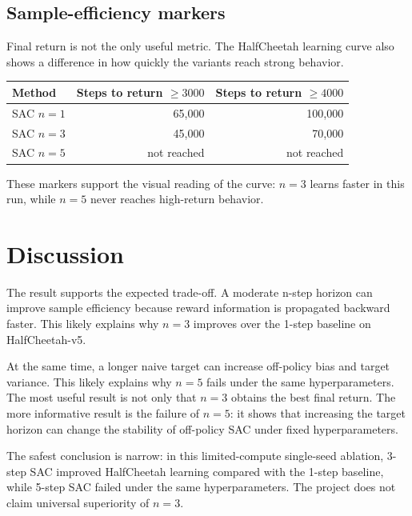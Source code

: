 \documentclass[
  american,
]{article}
\begin{document}
\subsection{Sample-efficiency markers}\label{sample-efficiency-markers}

Final return is not the only useful metric. The HalfCheetah learning
curve also shows a difference in how quickly the variants reach strong
behavior.

\begin{longtable}[]{@{}lrr@{}}
\toprule\noalign{}
Method & Steps to return \(\geq 3000\) & Steps to return
\(\geq 4000\) \\
\midrule\noalign{}
\endhead
\bottomrule\noalign{}
\endlastfoot
SAC \(n=1\) & 65,000 & 100,000 \\
SAC \(n=3\) & 45,000 & 70,000 \\
SAC \(n=5\) & not reached & not reached \\
\end{longtable}

These markers support the visual reading of the curve: \(n=3\) learns
faster in this run, while \(n=5\) never reaches high-return behavior.

\section{Discussion}\label{discussion}

The result supports the expected trade-off. A moderate n-step horizon
can improve sample efficiency because reward information is propagated
backward faster. This likely explains why \(n=3\) improves over the
1-step baseline on HalfCheetah-v5.

At the same time, a longer naive target can increase off-policy bias and
target variance. This likely explains why \(n=5\) fails under the same
hyperparameters. The most useful result is not only that \(n=3\) obtains
the best final return. The more informative result is the failure of
\(n=5\): it shows that increasing the target horizon can change the
stability of off-policy SAC under fixed hyperparameters.

\begin{warningbox}
The safest conclusion is narrow: in this limited-compute single-seed ablation, 3-step SAC improved HalfCheetah learning compared with the 1-step baseline, while 5-step SAC failed under the same hyperparameters. The project does not claim universal superiority of $n=3$.
\end{warningbox}
\end{document}
